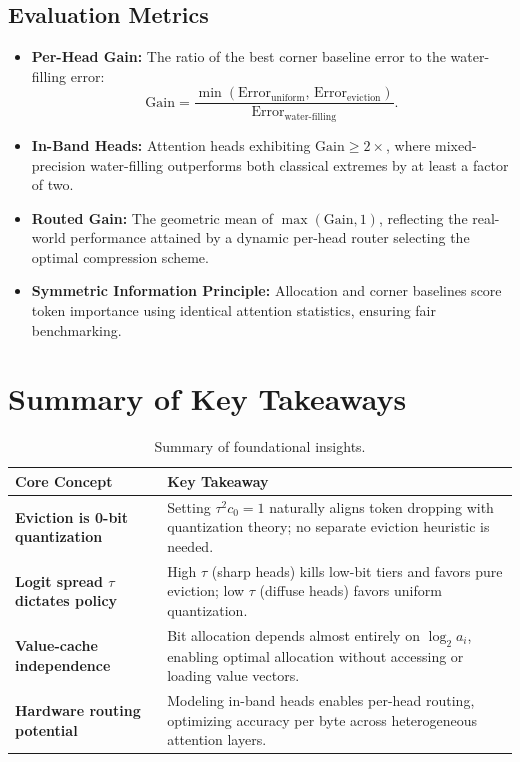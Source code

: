 \subsection{Evaluation Metrics}
\begin{itemize}
    \item \textbf{Per-Head Gain:} The ratio of the best corner baseline error to the water-filling error:
    \begin{equation}
        \mathrm{Gain} = \frac{\min\left(\mathrm{Error}_{\mathrm{uniform}}, \, \mathrm{Error}_{\mathrm{eviction}}\right)}{\mathrm{Error}_{\mathrm{water\text{-}filling}}}.
    \end{equation}
    \item \textbf{In-Band Heads:} Attention heads exhibiting $\mathrm{Gain} \ge 2\times$, where mixed-precision water-filling outperforms both classical extremes by at least a factor of two.
    \item \textbf{Routed Gain:} The geometric mean of $\max(\mathrm{Gain}, 1)$, reflecting the real-world performance attained by a dynamic per-head router selecting the optimal compression scheme.
    \item \textbf{Symmetric Information Principle:} Allocation and corner baselines score token importance using identical attention statistics, ensuring fair benchmarking.
\end{itemize}


\section{Summary of Key Takeaways}
\begin{table}[h]
\centering
\small
\begin{tabular}{@{}p{}p{}@{}}
\toprule
\textbf{Core Concept} & \textbf{Key Takeaway} \\
\midrule
\textbf{Eviction is 0-bit quantization} & Setting $\tau^2 c_0 = 1$ naturally aligns token dropping with quantization theory; no separate eviction heuristic is needed. \\
\addlinespace
\textbf{Logit spread $\tau$ dictates policy} & High $\tau$ (sharp heads) kills low-bit tiers and favors pure eviction; low $\tau$ (diffuse heads) favors uniform quantization. \\
\addlinespace
\textbf{Value-cache independence} & Bit allocation depends almost entirely on $\log_2 a_i$, enabling optimal allocation without accessing or loading value vectors. \\
\addlinespace
\textbf{Hardware routing potential} & Modeling in-band heads enables per-head routing, optimizing accuracy per byte across heterogeneous attention layers. \\
\bottomrule
\end{tabular}
\caption{Summary of foundational insights.}
\label{tab:takeaways}
\end{table}




